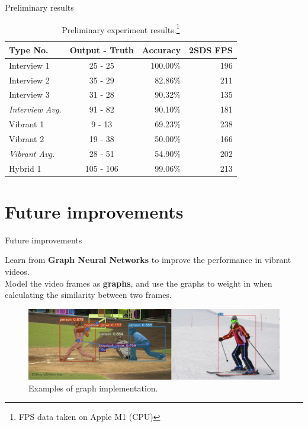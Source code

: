 \documentclass[aspectratio=43,display]{beamer}
\begin{document}
		\begin{frame}{Preliminary results}

			\begin{table}
				\centering
				\begin{tabular}{l c r r}
					\hline
					Type No. & Output - Truth & Accuracy & 2SDS FPS  \\
					\hline
					Interview 1 & 25 - 25 & 100.00\% & 196 \\
					Interview 2 & 35 - 29 & 82.86\% & 211 \\
					Interview 3 & 31 - 28 & 90.32\% & 135 \\
					\textit{Interview Avg.} & 91 - 82 & 90.10\% & 181 \\
					\hline
					Vibrant 1 & 9 - 13 & 69.23\% & 238 \\
					Vibrant 2 & 19 - 38 & 50.00\% & 166 \\
					\textit{Vibrant Avg.} & 28 - 51 & 54.90\% & 202 \\
					\hline
					Hybrid 1 & 105 - 106 & 99.06\% & 213 \\
					\hline
				\end{tabular}
			\caption{\label{tab:Results}Preliminary experiment results.\footnote{FPS data taken on Apple M1 (CPU)}}
			\end{table}

		\end{frame}


	\section{Future improvements}

		\begin{frame}{Future improvements}

			Learn from \textbf{Graph Neural Networks} to improve the performance in vibrant videos.\\
			Model the video frames as \textbf{graphs}, and use the graphs to weight in when calculating the similarity between two frames.

			\vskip 0.2cm

			\begin{figure}
				\includegraphics[width=\textwidth]{images/graph-exp.png}
				\caption{\label{fig:Graph-Example}Examples of graph implementation.}
			\end{figure}

		\end{frame}
\end{document}
